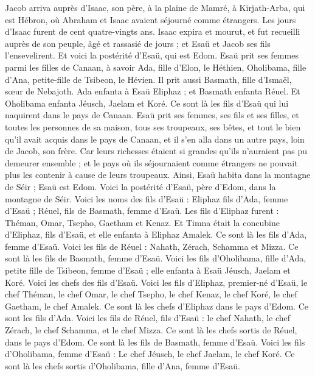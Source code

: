 \begin{multicols}{2}
Jacob arriva auprès d'Isaac, son père, à la plaine de Mamré, à Kirjath-Arba, qui est Hébron, où Abraham et Isaac avaient séjourné comme étrangers.
Les jours d'Isaac furent de cent quatre-vingts ans.
Isaac expira et mourut, et fut recueilli auprès de son peuple, âgé et rassasié de jours ; et Esaü et Jacob ses fils l'ensevelirent.
\VerseOne{}Et voici la postérité d'Esaü, qui est Edom.
Esaü prit ses femmes parmi les filles de Canaan, à savoir Ada, fille d'Elon, le Héthien, Oholibama, fille d'Ana, petite-fille de Tsibeon, le Hévien.
Il prit aussi Basmath, fille d'Ismaël, sœur de Nebajoth.
Ada enfanta à Esaü Eliphaz ; et Basmath enfanta Réuel.
Et Oholibama enfanta Jéusch, Jaelam et Koré. Ce sont là les fils d'Esaü qui lui naquirent dans le pays de Canaan.
Esaü prit ses femmes, ses fils et ses filles, et toutes les personnes de sa maison, tous ses troupeaux, ses bêtes, et tout le bien qu'il avait acquis dans le pays de Canaan, et il s'en alla dans un autre pays, loin de Jacob, son frère.
Car leurs richesses étaient si grandes qu'ils n'auraient pas pu demeurer ensemble ; et le pays où ils séjournaient comme étrangers ne pouvait plus les contenir à cause de leurs troupeaux.
Ainsi, Esaü habita dans la montagne de Séir ; Esaü est Edom.
Voici la postérité d'Esaü, père d'Edom, dans la montagne de Séir.
Voici les noms des fils d'Esaü : Eliphaz fils d'Ada, femme d'Esaü ; Réuel, fils de Basmath, femme d'Esaü.
Les fils d'Eliphaz furent : Théman, Omar, Tsepho, Gaetham et Kenaz.
Et Timna était la concubine d'Eliphaz, fils d'Esaü, et elle enfanta à Eliphaz Amalek. Ce sont là les fils d'Ada, femme d'Esaü.
Voici les fils de Réuel : Nahath, Zérach, Schamma et Mizza. Ce sont là les fils de Basmath, femme d'Esaü.
Voici les fils d'Oholibama, fille d'Ada, petite fille de Tsibeon, femme d'Esaü ; elle enfanta à Esaü Jéusch, Jaelam et Koré.
Voici les chefs des fils d'Esaü. Voici les fils d'Eliphaz, premier-né d'Esaü, le chef Théman, le chef Omar, le chef Tsepho, le chef Kenaz,
le chef Koré, le chef Gaetham, le chef Amalek. Ce sont là les chefs d'Eliphaz dans le pays d'Edom. Ce sont les fils d'Ada.
Voici les fils de Réuel, fils d'Esaü : le chef Nahath, le chef Zérach, le chef Schamma, et le chef Mizza. Ce sont là les chefs sortis de Réuel, dans le pays d'Edom. Ce sont là les fils de Basmath, femme d'Esaü.
Voici les fils d'Oholibama, femme d'Esaü : Le chef Jéusch, le chef Jaelam, le chef Koré. Ce sont là les chefs sortis d'Oholibama, fille d'Ana, femme d'Esaü.

\end{multicols}
